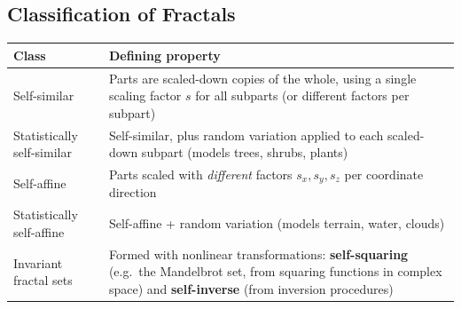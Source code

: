 \documentclass[12pt, a4paper]{article}
\newenvironment{answerbox}{\begin{mdframed}[style=answerframe]}{\end{mdframed}}
\begin{document}
\subsection{Classification of Fractals}
\begin{answerbox}
\begin{center}
\begin{tabular}{p{3.2cm}p{10.2cm}}
\toprule
\textbf{Class} & \textbf{Defining property} \\
\midrule
Self-similar & Parts are scaled-down copies of the whole, using a single scaling factor $s$ for all subparts (or different factors per subpart) \\
Statistically self-similar & Self-similar, plus random variation applied to each scaled-down subpart (models trees, shrubs, plants) \\
Self-affine & Parts scaled with \emph{different} factors $s_x,s_y,s_z$ per coordinate direction \\
Statistically self-affine & Self-affine + random variation (models terrain, water, clouds) \\
Invariant fractal sets & Formed with nonlinear transformations: \textbf{self-squaring} (e.g.\ the Mandelbrot set, from squaring functions in complex space) and \textbf{self-inverse} (from inversion procedures) \\
\bottomrule
\end{tabular}
\end{center}
\end{answerbox}
\end{document}
